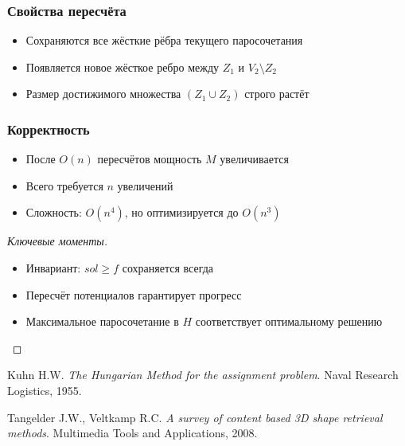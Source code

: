 \documentclass[a4paper,14pt]{extarticle}
\begin{document}
\subsubsection*{Свойства пересчёта}
\begin{itemize}
\item Сохраняются все жёсткие рёбра текущего паросочетания
\item Появляется новое жёсткое ребро между $Z_1$ и $V_2 \setminus Z_2$
\item Размер достижимого множества $(Z_1 \cup Z_2)$ строго растёт
\end{itemize}

\subsubsection*{Корректность}
\begin{itemize}
\item После $O(n)$ пересчётов мощность $M$ увеличивается
\item Всего требуется $n$ увеличений
\item Сложность: $O(n^4)$, но оптимизируется до $O(n^3)$
\end{itemize}

\begin{proof}[Ключевые моменты]
\begin{itemize}
\item Инвариант: $sol \geq f$ сохраняется всегда
\item Пересчёт потенциалов гарантирует прогресс
\item Максимальное паросочетание в $H$ соответствует оптимальному решению
\end{itemize}
\end{proof}



\begin{thebibliography}{9}
Kuhn H.W. 
\textit{The Hungarian Method for the assignment problem}. 
Naval Research Logistics, 1955.

Tangelder J.W., Veltkamp R.C. 
\textit{A survey of content based 3D shape retrieval methods}. 
Multimedia Tools and Applications, 2008.
\end{thebibliography}
\end{document}
